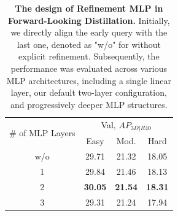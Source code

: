 \begin{table}[h!]
    \centering
    \caption{\textbf{The design of Refinement MLP in Forward-Looking Distillation.} Initially, we directly align the early query with the last one, denoted as "w/o" for without explicit refinement. Subsequently, the performance was evaluated across various MLP architectures, including a single linear layer, our default two-layer configuration, and progressively deeper MLP structures.} 
    \begin{tabular}{c|ccc}
         \toprule
         \multirow{2}{*}{\# of MLP Layers} & \multicolumn{3}{c}{Val, $AP_{3D|R40}$} \\
          & Easy & Mod. & Hard \\ \midrule \midrule
         w/o & 29.71 & 21.32 & 18.05 \\
         1 &  29.84 & 21.46 & 18.13 \\
         2 & \textbf{30.05} & \textbf{21.54} & \textbf{18.31}\\
         3 & 29.31 & 21.24 & 17.94 \\
         \bottomrule
    \end{tabular}
    \label{tab:refine_mlp_distill}
\end{table}